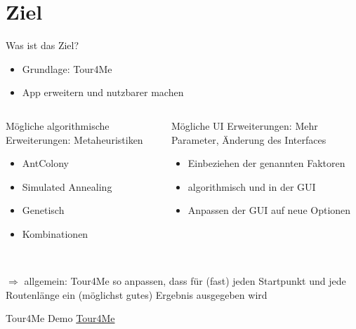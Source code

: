 \documentclass[aspectratio=169,xcolor=dvipsnames, t]{beamer}
\begin{document}
	\section{Ziel}
	\begin{frame}
		\vspace{0.25cm}
		Was ist das Ziel?
		\pause
		\begin{itemize}[<+->]
			\item Grundlage: Tour4Me
			\item App erweitern und nutzbarer machen
		\end{itemize}
		\pause
		\begin{columns}
			\begin{column}{0.48\textwidth}
				\begin{block}{ Mögliche algorithmische Erweiterungen: Metaheuristiken}		
					\pause			
					\begin{itemize}[<+->]
						\item AntColony
						\item Simulated Annealing
						\item Genetisch
						\item Kombinationen
					\end{itemize}
				\end{block}
			\end{column}
			\pause
			\begin{column}{0.48\textwidth}
				\begin{block}{Mögliche UI Erweiterungen: Mehr Parameter, Änderung des Interfaces}
					\pause
					\begin{itemize}[<+->]
						\item Einbeziehen der genannten Faktoren
						\item algorithmisch und in der GUI
						\item Anpassen der GUI auf neue Optionen
					\end{itemize}
				\end{block}
			\end{column}
		\end{columns} ~\\
		
		\pause
		$\Rightarrow$ allgemein: Tour4Me so anpassen, dass für (fast) jeden Startpunkt und jede Routenlänge ein (möglichst gutes) Ergebnis ausgegeben wird
	\end{frame}
	
	\begin{frame}{Tour4Me Demo}
		\centering
		\vspace{2cm}
		\Huge \href{http://tour4me.cs.tu-dortmund.de/} {Tour4Me}
	\end{frame}
	
\end{document}
